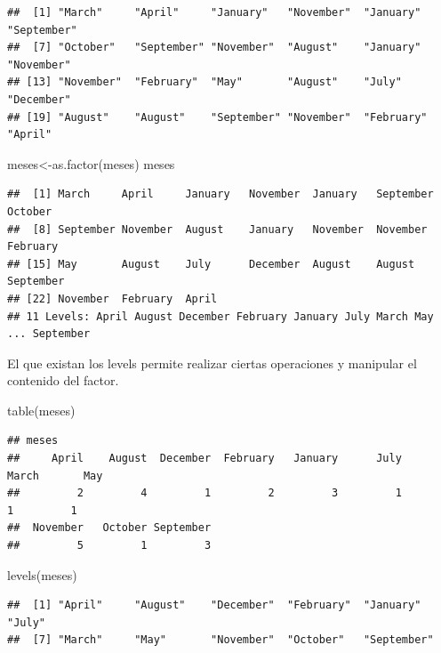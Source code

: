\documentclass[
]{book}
\newenvironment{Shaded}{\begin{snugshade}}{\end{snugshade}}
\newcommand{\FunctionTok}[1]{\textcolor[rgb]{0.00,0.00,0.00}{#1}}
\newcommand{\NormalTok}[1]{#1}
\newcommand{\OtherTok}[1]{\textcolor[rgb]{0.56,0.35,0.01}{#1}}
\begin{document}
\begin{verbatim}
##  [1] "March"     "April"     "January"   "November"  "January"   "September"
##  [7] "October"   "September" "November"  "August"    "January"   "November" 
## [13] "November"  "February"  "May"       "August"    "July"      "December" 
## [19] "August"    "August"    "September" "November"  "February"  "April"
\end{verbatim}

\begin{Shaded}
\begin{Highlighting}[]
\NormalTok{meses}\OtherTok{\textless{}{-}}\FunctionTok{as.factor}\NormalTok{(meses)}
\NormalTok{meses}
\end{Highlighting}
\end{Shaded}

\begin{verbatim}
##  [1] March     April     January   November  January   September October  
##  [8] September November  August    January   November  November  February 
## [15] May       August    July      December  August    August    September
## [22] November  February  April    
## 11 Levels: April August December February January July March May ... September
\end{verbatim}

El que existan los levels permite realizar ciertas operaciones y manipular el contenido del factor.

\begin{Shaded}
\begin{Highlighting}[]
\FunctionTok{table}\NormalTok{(meses)}
\end{Highlighting}
\end{Shaded}

\begin{verbatim}
## meses
##     April    August  December  February   January      July     March       May 
##         2         4         1         2         3         1         1         1 
##  November   October September 
##         5         1         3
\end{verbatim}

\begin{Shaded}
\begin{Highlighting}[]
\FunctionTok{levels}\NormalTok{(meses)}
\end{Highlighting}
\end{Shaded}

\begin{verbatim}
##  [1] "April"     "August"    "December"  "February"  "January"   "July"     
##  [7] "March"     "May"       "November"  "October"   "September"
\end{verbatim}
\end{document}

